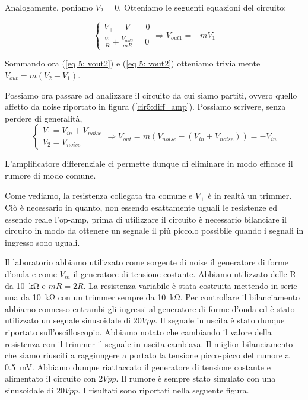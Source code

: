 Analogamente, poniamo $V_2=0$. Otteniamo le seguenti equazioni del circuito:

\begin{equation}
\begin{cases} V_+=V_-=0  \\ \frac{V_1}{R}+\frac{V_{out2}}{mR}=0 \end{cases}  \Rightarrow V_{out1}=-mV_1
\label{eq 5: vout1}
\end{equation}

Sommando ora (\ref{eq 5: vout2}) e (\ref{eq 5: vout2}) otteniamo trivialmente $V_{out}=m(V_2-V_1)$.

Possiamo ora passare ad analizzare il circuito da cui siamo partiti, ovvero quello affetto da noise riportato in figura (\ref{cir5:diff_amp}). Possiamo scrivere, senza perdere di generalità,
$$
\begin{cases} V_1=V_{in}+V_{noise} \\ V_2=V_{noise} \end{cases}  \Rightarrow V_{out}=m(V_{noise}-(V_{in}+V_{noise}))=-V_{in}
$$

L'amplificatore differenziale ci permette dunque di eliminare in modo efficace il rumore di modo comune. 

Come vediamo, la resistenza collegata tra comune e $V_+$ è in realtà un trimmer. Ciò è necessario in quanto, non essendo esattamente uguali le resistenze ed essendo reale l'op-amp, prima di utilizzare il circuito è necessario bilanciare il circuito in modo da ottenere un segnale il più piccolo possibile quando i segnali in ingresso sono uguali. 

Il laboratorio abbiamo utilizzato come sorgente di noise il generatore di forme d'onda e come $V_{in}$ il generatore di tensione costante. Abbiamo utilizzato delle R da \SI{10}{\kilo\ohm} e $mR=2R$. La resistenza variabile è stata costruita mettendo in serie una da \SI{10}{\kilo\ohm} con un trimmer sempre da \SI{10}{\kilo\ohm}. Per controllare il bilanciamento abbiamo connesso entrambi gli ingressi al generatore di forme d'onda ed è stato utilizzato un segnale sinusoidale di $20Vpp$. Il segnale in uscita è stato dunque riportato sull'oscilloscopio. Abbiamo notato che cambiando il valore della resistenza con il trimmer il segnale in uscita cambiava. Il miglior bilanciamento che siamo riusciti a raggiungere a portato la tensione picco-picco del rumore a \SI{0.5}{\milli\volt}. Abbiamo dunque riattaccato il generatore di tensione costante e alimentato il circuito con $2Vpp$. Il rumore è sempre stato simulato con una sinusoidale di $20Vpp$. I risultati sono riportati nella seguente figura.

